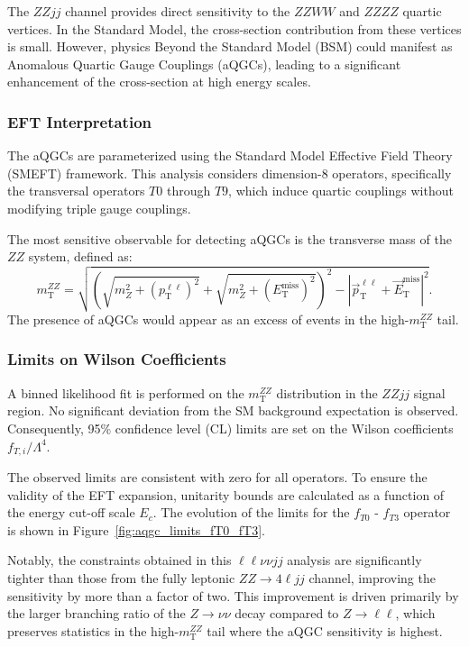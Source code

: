 The $ZZjj$ channel provides direct sensitivity to the $ZZWW$ and $ZZZZ$ quartic vertices. In the Standard Model, the cross-section contribution from these vertices is small. However, physics Beyond the Standard Model (BSM) could manifest as Anomalous Quartic Gauge Couplings (aQGCs), leading to a significant enhancement of the cross-section at high energy scales.

\subsubsection{EFT Interpretation}

The aQGCs are parameterized using the Standard Model Effective Field Theory (SMEFT) framework. This analysis considers dimension-8 operators, specifically the transversal operators $T0$ through $T9$, which induce quartic couplings without modifying triple gauge couplings.

The most sensitive observable for detecting aQGCs is the transverse mass of the $ZZ$ system, defined as:
\begin{equation}
    m_{\mathrm{T}}^{ZZ} = \sqrt{ \left( \sqrt{m_Z^2 + (p_{\mathrm{T}}^{\ell\ell})^2} + \sqrt{m_Z^2 + (E_{\mathrm{T}}^{\text{miss}})^2} \right)^2 - \left| \vec{p}_{\mathrm{T}}^{\ell\ell} + \vec{E}_{\mathrm{T}}^{\text{miss}} \right|^2 }.
\end{equation}
The presence of aQGCs would appear as an excess of events in the high-$m_{\mathrm{T}}^{ZZ}$ tail.

\subsubsection{Limits on Wilson Coefficients}

A binned likelihood fit is performed on the $m_{\mathrm{T}}^{ZZ}$ distribution in the $ZZjj$ signal region. No significant deviation from the SM background expectation is observed. Consequently, 95\% confidence level (CL) limits are set on the Wilson coefficients $f_{T,i}/\Lambda^4$.

The observed limits are consistent with zero for all operators. To ensure the validity of the EFT expansion, unitarity bounds are calculated as a function of the energy cut-off scale $E_c$. The evolution of the limits for the $f_{T0}$ - $f_{T3}$ operator is shown in Figure~\ref{fig:aqgc_limits_fT0_fT3}.

Notably, the constraints obtained in this $\ell\ell\nu\nu jj$ analysis are significantly tighter than those from the fully leptonic $ZZ \to 4\ell jj$ channel, improving the sensitivity by more than a factor of two. This improvement is driven primarily by the larger branching ratio of the $Z \to \nu\nu$ decay compared to $Z \to \ell\ell$, which preserves statistics in the high-$m_{\mathrm{T}}^{ZZ}$ tail where the aQGC sensitivity is highest.

